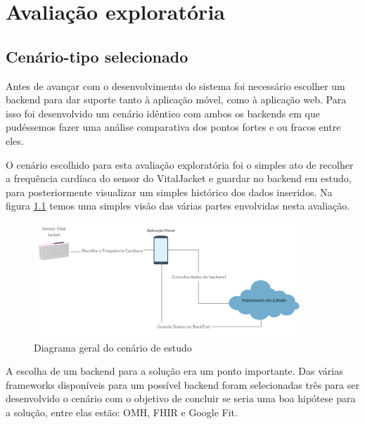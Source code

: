 \chapter{Avaliação exploratória}

\section{Cenário-tipo selecionado}

Antes de avançar com o desenvolvimento do sistema foi necessário escolher um backend para dar suporte tanto à aplicação móvel, como à aplicação web. Para isso foi desenvolvido um cenário idêntico com ambos os backends em que pudéssemos fazer uma análise comparativa dos pontos fortes e ou fracos entre eles. \par 
O cenário escolhido para esta avaliação exploratória foi o simples ato de recolher a frequência cardíaca do sensor do VitalJacket e guardar no backend em estudo, para posteriormente visualizar um simples histórico dos dados inseridos. Na figura \ref{f:study-overview} temos uma simples visão das várias partes envolvidas nesta avaliação.

\begin{figure}[H]
  \centering
  \includegraphics[width=0.9\textwidth]{imgs/study-overview.png}
  \caption[Diagrama geral do cenário de estudo]{Diagrama geral do cenário de estudo}
  
  \label{f:study-overview}
\end{figure}

A escolha de um backend para a solução era um ponto importante. Das várias frameworks disponíveis para um possível backend foram selecionadas três para ser desenvolvido o cenário com o objetivo de concluir se seria uma boa hipótese para a solução, entre elas estão: \gls{OMH}, \gls{FHIR} e Google Fit. \par

